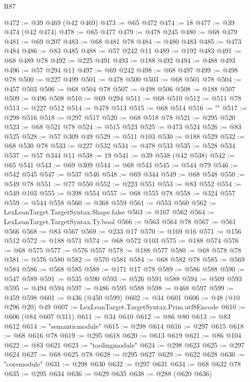 \begin{lexlean}{R87}
\begin{coremodule}
{@472 := @39 @469 (@42 @469)
@473 := @65 @472
@474 := 18
@477 := @39 @474 (@42 @474)
@478 := @65 @477
@479 := @478 @245
@480 := @68 @479
@481 := @69 @207
@483 := @68 @481 @78
@484 := @480 @483
@485 := @473 @484
@486 := @83 @485
@488 := @57 @242 @11
@489 := @192 @483
@491 := @68 @489 @78
@492 := @225 @491
@493 := @188 @492
@494 := @488 @493
@496 := @57 @294 @11
@497 := @69 @242
@498 := @68 @497
@499 := @498 @78
@500 := @227 @499
@501 := @478 @500
@503 := @68 @501 @78
@504 := @457 @503
@506 := @68 @504 @78
@507 := @498 @506
@508 := @188 @507
@509 := @496 @508
@510 := @69 @294
@511 := @68 @510
@512 := @511 @78
@513 := @227 @512
@514 := @478 @513
@515 := @68 @514
@516 := "{"
@517 := @298 @516
@518 := @297 @517
@520 := @68 @518 @78
@521 := @295 @520
@523 := @68 @521 @78
@524 := @515 @523
@525 := @473 @524
@526 := @83 @525
@528 := @57 @309 @49
@529 := @511 @103
@530 := @188 @529
@532 := @68 @530 @78
@533 := @227 @532
@534 := @478 @533
@535 := @528 @534
@537 := @57 @344 @11
@538 := 19
@541 := @39 @538 (@42 @538)
@542 := @65 @541
@543 := @69 @309
@544 := @68 @543
@545 := @544 @79
@546 := @542 @545
@547 := @537 @546
@548 := @69 @344
@549 := @68 @548
@550 := @549 @78
@551 := @77 @550
@552 := @223 @551
@553 := @83 @552
@554 := @549 @103
@555 := @398 @554
@557 := @68 @555 @78
@558 := @324 @557
@559 := @544 @558
@560 := @368 @559
@561 := @553 @560
@562 := LexLeanTarget.TargetSyntax.Shape.false
@563 := @167 @562
@564 := LexLeanTarget.TargetSyntax.Ty.bool
@566 := @563 @564 @78
@567 := @561 @566
@568 := @83 @567
@569 := @233 @17
@570 := @169 @16
@571 := @156 @512
@572 := @188 @571
@574 := @68 @572 @103
@575 := @188 @574
@576 := @68 @575
@577 := @576 @557
@578 := @188 @577
@580 := @68 @578 @78
@581 := @576 @580
@582 := @570 @581
@584 := @68 @582 @78
@585 := @569 @584
@586 := @568 @585
@588 := @171 @17 @78
@589 := @586 @588
@590 := @547 @589
@591 := @535 @590
@593 := @526 @591 @588
@594 := @509 @593
@595 := @494 @594
@597 := @486 @595 @588
@598 := @468 @597
@599 := @459 @598
@601 := @436 (@450 @599)
@602 := @34 @601
@606 := @48 (@10 @296 @20) @49
@607 := LexLeanTarget.TargetSyntax.Prim.utf8Encode
@610 := @606 (@84 @607 @311)
@611 := @34 @610
@612 := @86 @80
@613 := @83 @612
@614 := "semanticmodule"
@615 := @298 @614
@616 := @297 @615
@618 := @68 @616 @78
@619 := @295 @618
@620 := @613 @619
@621 := @86 @104
@622 := @83 @621
@623 := "toolingmodule"
@624 := @298 @623
@625 := @297 @624
@627 := @68 @625 @78
@628 := @295 @627
@629 := @622 @628
@630 := "coremodule"
@631 := @298 @630
@632 := @297 @631
@634 := @68 @632 @78
@635 := @295 @634
@636 := @629 @635
@638 := @288 (@620 @636)
}}
\end{coremodule}
\end{lexlean}
